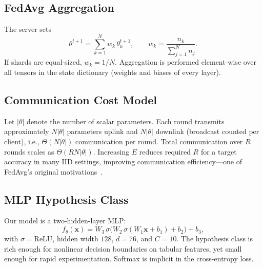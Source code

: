 \documentclass[journal]{IEEEtran}
\begin{document}
\subsection{FedAvg Aggregation}
The server sets
\begin{equation}
\label{eq:fedavg}
\theta^{t+1}=\sum_{k=1}^{N} w_k\,\theta_k^{t+1},
\qquad
w_k=\frac{n_k}{\sum_{j=1}^{N}n_j}.
\end{equation}
If shards are equal-sized, $w_k=1/N$. Aggregation is performed element-wise over all tensors in the state dictionary (weights and biases of every layer).

\subsection{Communication Cost Model}
Let $|\theta|$ denote the number of scalar parameters. Each round transmits approximately $N|\theta|$ parameters uplink and $N|\theta|$ downlink (broadcast counted per client), i.e., $\Theta(N|\theta|)$ communication per round. Total communication over $R$ rounds scales as $\Theta(R N |\theta|)$. Increasing $E$ reduces required $R$ for a target accuracy in many IID settings, improving communication efficiency---one of FedAvg's original motivations~\cite{mcmahan2017communication}.

\subsection{MLP Hypothesis Class}
Our model is a two-hidden-layer MLP:
\begin{equation}
f_{\theta}(\mathbf{x})=W_3\,\sigma\big(W_2\,\sigma(W_1\mathbf{x}+b_1)+b_2\big)+b_3,
\end{equation}
with $\sigma=\mathrm{ReLU}$, hidden width $128$, $d=76$, and $C=10$. The hypothesis class is rich enough for nonlinear decision boundaries on tabular features, yet small enough for rapid experimentation. Softmax is implicit in the cross-entropy loss.
\end{document}
